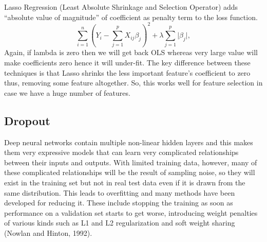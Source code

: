 Lasso Regression (Least Absolute Shrinkage and Selection Operator) adds
``absolute value of magnitude'' of coefficient as penalty term to the loss function.
\begin{equation}
	\label{equ:lasso_regresson}
	\sum_{i=1}^{n}(Y_{i}-\sum_{j=1}^{p}X_{ij}\beta_{j})^{2} + \lambda \sum_{j=1}^{p}
	\vert \beta_{j} \vert,
\end{equation}
Again, if lambda is zero then we will get back OLS whereas very large value will make coefficients 
zero hence it will under-fit.
The key difference between these techniques is that Lasso shrinks the less important feature’s 
coefficient to zero thus, removing some feature altogether. 
So, this works well for feature selection in case we have a huge number of features.

\subsection{Dropout}
\FloatBarrier
Deep neural networks contain multiple non-linear hidden layers and this makes them very
expressive models that can learn very complicated relationships between their inputs and
outputs. With limited training data, however, many of these complicated relationships
will be the result of sampling noise, so they will exist in the training set but not in real
test data even if it is drawn from the same distribution. This leads to overfitting and many
methods have been developed for reducing it. These include stopping the training as soon as
performance on a validation set starts to get worse, introducing weight penalties of various
kinds such as L1 and L2 regularization and soft weight sharing (Nowlan and Hinton, 1992).

